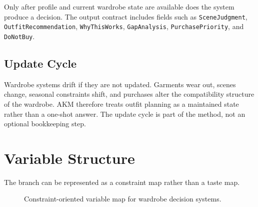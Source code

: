 \documentclass[11pt]{article}
\begin{document}
Only after profile and current wardrobe state are available does the system produce a decision. The output contract includes fields such as \texttt{SceneJudgment}, \texttt{OutfitRecommendation}, \texttt{WhyThisWorks}, \texttt{GapAnalysis}, \texttt{PurchasePriority}, and \texttt{DoNotBuy}.

\subsection{Update Cycle}

Wardrobe systems drift if they are not updated. Garments wear out, scenes change, seasonal constraints shift, and purchases alter the compatibility structure of the wardrobe. AKM therefore treats outfit planning as a maintained state rather than a one-shot answer. The update cycle is part of the method, not an optional bookkeeping step.

\section{Variable Structure}

The branch can be represented as a constraint map rather than a taste map.

\begin{figure}[htbp]
\centering
{}
\caption{Constraint-oriented variable map for wardrobe decision systems.}
\end{figure}
\end{document}
